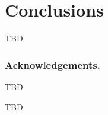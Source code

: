 \documentclass[russian,english]{llncs}
\begin{document}
\section{Conclusions}
\label{sec:Conclusions}

TBD

\bigskip
\subsubsection*{Acknowledgements.}

TBD

%
%

\begin{thebibliography}{10}

TBD

\end{thebibliography}
\end{document}
